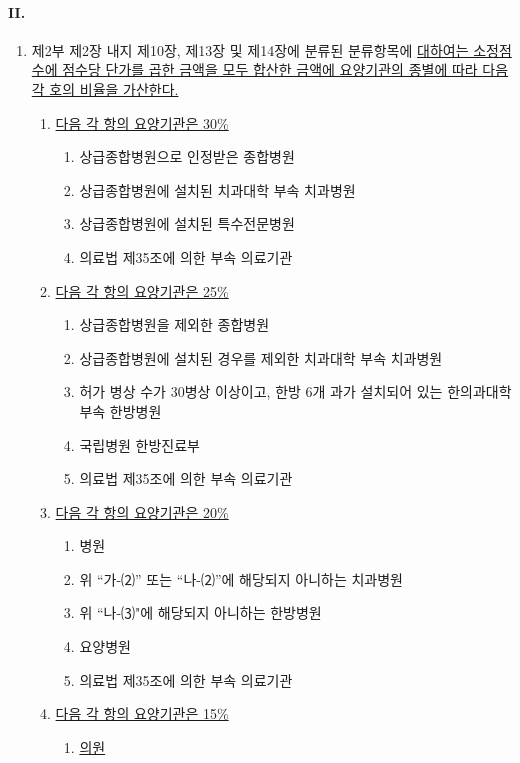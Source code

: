 \paragraph{II. }
\begin{enumerate}[1.]\tightlist
\item 제2부 제2장 내지 제10장, 제13장 및 제14장에 분류된 분류항목에 \uline{대하여는 소정점수에 점수당 단가를 곱한 금액을 모두 합산한 금액에 요양기관의 종별에 따라 다음 각 호의 비율을 가산한다.}
	\begin{enumerate}[가.]\tightlist
	\item \uline{다음 각 항의 요양기관은 30\%}
		\begin{enumerate}[(1)]\tightlist
		\item 상급종합병원으로 인정받은 종합병원
		\item 상급종합병원에 설치된 치과대학 부속 치과병원
		\item 상급종합병원에 설치된 특수전문병원
		\item 의료법 제35조에 의한 부속 의료기관
		\end{enumerate}
	\item \uline{다음 각 항의 요양기관은 25\%}
		\begin{enumerate}[(1)]\tightlist
		\item 상급종합병원을 제외한 종합병원
		\item 상급종합병원에 설치된 경우를 제외한 치과대학 부속 치과병원
		\item 허가 병상 수가 30병상 이상이고, 한방 6개 과가 설치되어 있는 한의과대학 부속 한방병원
		\item 국립병원 한방진료부
		\item 의료법 제35조에 의한 부속 의료기관
		\end{enumerate}
	\item \uline{다음 각 항의 요양기관은 20\%}
		\begin{enumerate}[(1)]\tightlist
		\item 병원
		\item 위 “가-⑵” 또는 “나-⑵”에 해당되지 아니하는 치과병원
		\item 위 “나-⑶"에 해당되지 아니하는 한방병원
		\item 요양병원
		\item 의료법 제35조에 의한 부속 의료기관
		\end{enumerate}
	\item \uline{다음 각 항의 요양기관은 15\%}
		\begin{enumerate}[(1)]\tightlist
		\item \uline{의원}

\end{enumerate}
\end{enumerate}
\end{enumerate}

